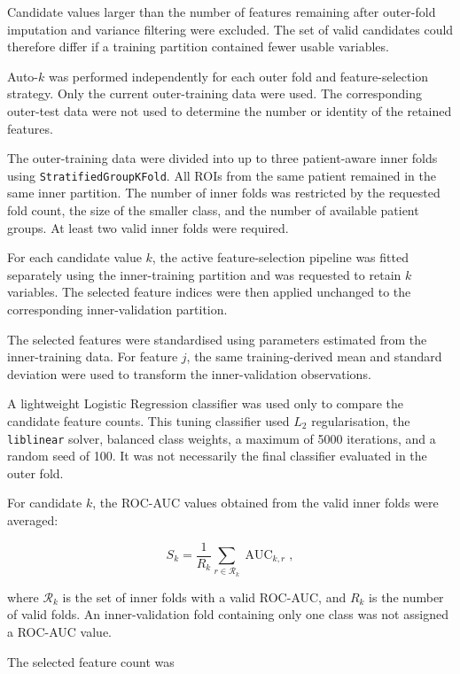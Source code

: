 \documentclass[12pt,twocolumn]{article}
\begin{document}
Candidate values larger than the number of features remaining after
outer-fold imputation and variance filtering were excluded. The set of
valid candidates could therefore differ if a training partition
contained fewer usable variables.

Auto-\(k\) was performed independently for each outer fold and
feature-selection strategy. Only the current outer-training data were
used. The corresponding outer-test data were not used to determine the
number or identity of the retained features.

The outer-training data were divided into up to three patient-aware
inner folds using \texttt{StratifiedGroupKFold}. All ROIs from the same
patient remained in the same inner partition. The number of inner folds
was restricted by the requested fold count, the size of the smaller
class, and the number of available patient groups. At least two valid
inner folds were required.

For each candidate value \(k\), the active feature-selection pipeline
was fitted separately using the inner-training partition and was
requested to retain \(k\) variables. The selected feature indices were
then applied unchanged to the corresponding inner-validation
partition.

The selected features were standardised using parameters estimated
from the inner-training data. For feature \(j\), the same
training-derived mean and standard deviation were used to transform
the inner-validation observations.

A lightweight Logistic Regression classifier was used only to compare
the candidate feature counts. This tuning classifier used \(L_2\)
regularisation, the \texttt{liblinear} solver, balanced class weights,
a maximum of 5000 iterations, and a random seed of 100. It was not
necessarily the final classifier evaluated in the outer fold.

For candidate \(k\), the ROC-AUC values obtained from the valid inner
folds were averaged:

\begin{equation}
S_k
=
\frac{1}{R_k}
\sum_{r \in \mathcal{R}_k}
\operatorname{AUC}_{k,r},
\label{eq:auto_k_mean_score}
\end{equation}

where \(\mathcal{R}_k\) is the set of inner folds with a valid
ROC-AUC, and \(R_k\) is the number of valid folds. An inner-validation
fold containing only one class was not assigned a ROC-AUC value.

The selected feature count was
\end{document}
